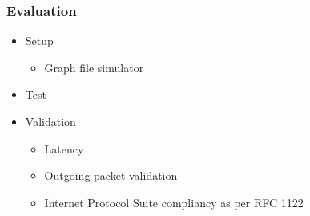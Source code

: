\newcommand{\EvaluationTitle}{Evaluation}
\begin{frame}
    \frametitle{\EvaluationTitle}
    \centering
    \begin{minipage}{1\textwidth}
        \begin{itemize}%
            \item Setup
            \begin{itemize}
                \item Graph file simulator
            \end{itemize}
            \item Test
            \item Validation
            \begin{itemize}
                \item Latency
                \item Outgoing packet validation
                \item Internet Protocol Suite
                compliancy as per RFC
                1122
            \end{itemize}
        \end{itemize}
    \end{minipage}
\end{frame}

